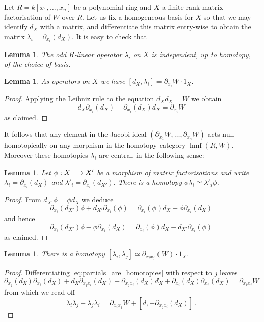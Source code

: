 \documentclass[english,letter paper,12pt,leqno]{article}
\newtheorem{lemma}[theorem]{Lemma}
\theoremstyle{example}
\numberwithin{equation}{section}
\def\be{\begin{equation}}
\def\ee{\end{equation}}
\DeclareMathOperator{\hmf}{hmf}
\begin{document}
Let $R = k[x_1,\ldots,x_n]$ be a polynomial ring and $X$ a finite rank matrix factorisation of $W$ over $R$. Let us fix a homogeneous basis for $X$ so that we may identify $d_X$ with a matrix, and differentiate this matrix entry-wise to obtain the matrix $\lambda_i = \partial_{x_i}(d_X)$. It is easy to check that

\begin{lemma}\label{lemma:homotopy_indept} The odd $R$-linear operator $\lambda_i$ on $X$ is independent, up to homotopy, of the choice of basis.
\end{lemma}

\begin{lemma} As operators on $X$ we have $[ d_X, \lambda_i ] = \partial_{x_i} W \cdot 1_X$.
\end{lemma}
\begin{proof}
Applying the Leibniz rule to the equation $d_X d_X = W$ we obtain
\be\label{eq:partials_are_homotopies}
d_X \partial_{x_i}(d_X) + \partial_{x_i}(d_X) d_X = \partial_{x_i} W
\ee
as claimed.
\end{proof}

It follows that any element in the Jacobi ideal $( \partial_{x_1}W , \ldots, \partial_{x_n} W )$ acts null-homotopically on any morphism in the homotopy category $\hmf(R,W)$. Moreover these homotopies $\lambda_i$ are central, in the following sense:

\begin{lemma}\label{lemma:naturalityoflambda} Let $\phi: X \longrightarrow X'$ be a morphism of matrix factorisations and write $\lambda_i = \partial_{x_i}(d_X)$ and $\lambda'_i = \partial_{x_i}(d_{X'})$. There is a homotopy $\phi \lambda_i \simeq \lambda'_i \phi$.
\end{lemma}
\begin{proof}
From $d_{X'} \phi = \phi d_X$ we deduce
\[
\partial_{x_i}( d_{X'} ) \phi + d_{X'} \partial_{x_i}( \phi ) = \partial_{x_i}( \phi ) d_X + \phi \partial_{x_i}( d_X )
\]
and hence
\[
\partial_{x_i}( d_{X'} ) \phi - \phi \partial_{x_i}( d_X ) = \partial_{x_i}(\phi) d_X - d_{X'} \partial_{x_i}(\phi)
\]
as claimed.
\end{proof}

\begin{lemma}\label{lemma:commutator_of_lambdas} There is a homotopy $[ \lambda_i, \lambda_j ] \simeq \partial_{x_i x_j}(W) \cdot 1_X$.
\end{lemma}
\begin{proof}
Differentiating \eqref{eq:partials_are_homotopies} with respect to $j$ leaves
\[
\partial_{x_j}(d_X) \partial_{x_i}(d_X) + d_X \partial_{x_jx_i}(d_X) + \partial_{x_jx_i}(d_X) d_X + \partial_{x_i}(d_X) \partial_{x_j}(d_X) = \partial_{x_ix_j}W
\]
from which we read off
\[
\lambda_i \lambda_j + \lambda_j \lambda_i = \partial_{x_ix_j}W + [d, -\partial_{x_jx_i}(d_X)]\,.
\]
\end{proof}
\end{document}
